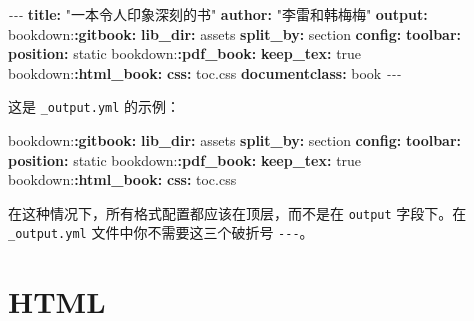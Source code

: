 \documentclass[
  12pt,
]{krantz}
\newenvironment{Shaded}{\begin{snugshade}}{\end{snugshade}}
\newcommand{\AttributeTok}[1]{\textcolor[rgb]{0.13,0.29,0.53}{#1}}
\newcommand{\CharTok}[1]{\textcolor[rgb]{0.31,0.60,0.02}{#1}}
\newcommand{\FunctionTok}[1]{\textcolor[rgb]{0.13,0.29,0.53}{\textbf{#1}}}
\newcommand{\KeywordTok}[1]{\textcolor[rgb]{0.13,0.29,0.53}{\textbf{#1}}}
\newcommand{\PreprocessorTok}[1]{\textcolor[rgb]{0.56,0.35,0.01}{\textit{#1}}}
\newcommand{\StringTok}[1]{\textcolor[rgb]{0.31,0.60,0.02}{#1}}
\theoremstyle{definition}
\theoremstyle{definition}
\theoremstyle{definition}
\theoremstyle{definition}
\theoremstyle{remark}
\begin{document}
\begin{Shaded}
\begin{Highlighting}[]
\PreprocessorTok{{-}{-}{-}}
\FunctionTok{title}\KeywordTok{:}\AttributeTok{ }\StringTok{"一本令人印象深刻的书"}
\FunctionTok{author}\KeywordTok{:}\AttributeTok{ }\StringTok{"李雷和韩梅梅"}
\FunctionTok{output}\KeywordTok{:}
\AttributeTok{  bookdown:}\FunctionTok{:gitbook}\KeywordTok{:}
\AttributeTok{    }\FunctionTok{lib\_dir}\KeywordTok{:}\AttributeTok{ assets}
\AttributeTok{    }\FunctionTok{split\_by}\KeywordTok{:}\AttributeTok{ section}
\AttributeTok{    }\FunctionTok{config}\KeywordTok{:}
\AttributeTok{      }\FunctionTok{toolbar}\KeywordTok{:}
\AttributeTok{        }\FunctionTok{position}\KeywordTok{:}\AttributeTok{ static}
\AttributeTok{  bookdown:}\FunctionTok{:pdf\_book}\KeywordTok{:}
\AttributeTok{    }\FunctionTok{keep\_tex}\KeywordTok{:}\AttributeTok{ }\CharTok{true}
\AttributeTok{  bookdown:}\FunctionTok{:html\_book}\KeywordTok{:}
\AttributeTok{    }\FunctionTok{css}\KeywordTok{:}\AttributeTok{ toc.css}
\FunctionTok{documentclass}\KeywordTok{:}\AttributeTok{ book}
\PreprocessorTok{{-}{-}{-}}
\end{Highlighting}
\end{Shaded}

这是 \texttt{\_output.yml} 的示例：

\begin{Shaded}
\begin{Highlighting}[]
\AttributeTok{bookdown:}\FunctionTok{:gitbook}\KeywordTok{:}
\AttributeTok{  }\FunctionTok{lib\_dir}\KeywordTok{:}\AttributeTok{ assets}
\AttributeTok{  }\FunctionTok{split\_by}\KeywordTok{:}\AttributeTok{ section}
\AttributeTok{  }\FunctionTok{config}\KeywordTok{:}
\AttributeTok{    }\FunctionTok{toolbar}\KeywordTok{:}
\AttributeTok{      }\FunctionTok{position}\KeywordTok{:}\AttributeTok{ static}
\AttributeTok{bookdown:}\FunctionTok{:pdf\_book}\KeywordTok{:}
\AttributeTok{  }\FunctionTok{keep\_tex}\KeywordTok{:}\AttributeTok{ }\CharTok{true}
\AttributeTok{bookdown:}\FunctionTok{:html\_book}\KeywordTok{:}
\AttributeTok{  }\FunctionTok{css}\KeywordTok{:}\AttributeTok{ toc.css}
\end{Highlighting}
\end{Shaded}

在这种情况下，所有格式配置都应该在顶层，而不是在 \texttt{output} 字段下。在 \texttt{\_output.yml} 文件中你不需要这三个破折号 \texttt{-\/-\/-}。

\hypertarget{html}{%
\section{HTML}\label{html}}
\end{document}
